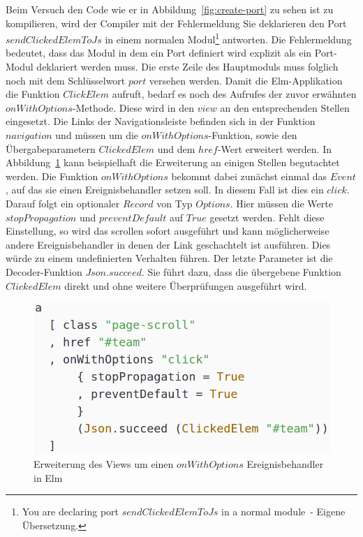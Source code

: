 Beim Versuch den Code wie er in Abbildung~\ref{fig:create-port} zu sehen ist zu kompilieren, wird der Compiler mit der Fehlermeldung \glqq Sie deklarieren den Port $sendClickedElemToJs$ in einem normalen Modul\grqq\footnote{\glqq You are declaring port $sendClickedElemToJs$ in a normal module\grqq~- Eigene Übersetzung.} antworten. Die Fehlermeldung bedeutet, dass das Modul in dem ein Port definiert wird explizit als ein Port-Modul deklariert werden muss. Die erste Zeile des Hauptmoduls muss folglich noch mit dem Schlüsselwort $port$ versehen werden. Damit die Elm-Applikation die Funktion $ClickElem$ aufruft, bedarf es noch des Aufrufes der zuvor erwähnten $onWithOptions$-Methode. Diese wird in den $view$ an den entsprechenden Stellen eingesetzt. Die Links der Navigationsleiste befinden sich in der Funktion $navigation$ und müssen um die $onWithOptions$-Funktion, sowie den Übergabeparametern $ClickedElem$ und dem $href$-Wert erweitert werden. In Abbildung~\ref{fig:elm-view-onclick} kann beispielhaft die Erweiterung an einigen Stellen begutachtet werden. Die Funktion $onWithOptions$ bekommt dabei zunächst einmal das $Event$, auf das sie einen Ereignisbehandler setzen soll. In diesem Fall ist dies ein $click$. Darauf folgt ein optionaler $Record$ von Typ $Options$. Hier müssen die Werte $stopPropagation$ und $preventDefault$ auf $True$ gesetzt werden. Fehlt diese Einstellung, so wird das scrollen sofort ausgeführt und kann möglicherweise andere Ereignisbehandler in denen der Link geschachtelt ist ausführen. Dies würde zu einem undefinierten Verhalten führen. Der letzte Parameter ist die Decoder-Funktion $Json.succeed$. Sie führt dazu, dass die übergebene Funktion $ClickedElem$ direkt und ohne weitere Überprüfungen ausgeführt wird.
\begin{figure}[hbt]
\centering
\includegraphics[scale=0.4]{img/elm-view-onclick.png}
\caption{Erweiterung des Views um einen $onWithOptions$ Ereignisbehandler in Elm}\label{fig:elm-view-onclick}
\end{figure}
